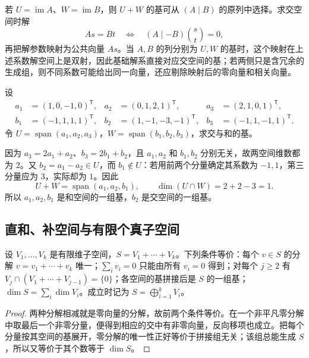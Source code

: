 若 $U=\operatorname{im}A$、$W=\operatorname{im}B$，则 $U+W$ 的基可从 $(A\mid B)$ 的原列中选择。求交空间时解
\begin{equation}
\label{eq:laex-intersection-system}
As=Bt\quad\Longleftrightarrow\quad (A\mid-B)\binom st=0,
\end{equation}
再把解参数映射为公共向量 $As$。当 $A,B$ 的列分别为 $U,W$ 的基时，这个映射在上述系数解空间上是双射，因此基础解系直接对应交空间的基；若两侧只是含冗余的生成组，则不同系数可能给出同一向量，还应剔除映射后的零向量和相关向量。

\begin{example}
\label{ex:laex-intersection}
设
\[
\begin{aligned}
a_1&=(1,0,-1,0)^{\mathsf T},&a_2&=(0,1,2,1)^{\mathsf T},&a_3&=(2,1,0,1)^{\mathsf T},\\
b_1&=(-1,1,1,1)^{\mathsf T},&b_2&=(1,-1,-3,-1)^{\mathsf T},&b_3&=(-1,1,-1,1)^{\mathsf T}.
\end{aligned}
\]
令 $U=\operatorname{span}(a_1,a_2,a_3)$，$W=\operatorname{span}(b_1,b_2,b_3)$，求交与和的基。
\end{example}

\begin{solve}
因为 $a_3=2a_1+a_2$、$b_3=2b_1+b_2$，且 $a_1,a_2$ 和 $b_1,b_2$ 分别无关，故两空间维数都为 $2$。又 $b_2=a_1-a_2\in U$，而 $b_1\notin U$：若用前两个分量确定其系数为 $-1,1$，第三分量应为 $3$，实际却为 $1$。因此
\[
U+W=\operatorname{span}(a_1,a_2,b_1),\qquad
\dim(U\cap W)=2+2-3=1.
\]
所以 $a_1,a_2,b_1$ 是和空间的一组基，$b_2$ 是交空间的一组基。
\end{solve}

\subsection{直和、补空间与有限个真子空间}

\begin{proposition}
\label{prop:laex-direct-sum}
设 $V_1,\ldots,V_k$ 是有限维子空间，$S=V_1+\cdots+V_k$。下列条件等价：每个 $v\in S$ 的分解 $v=v_1+\cdots+v_k$ 唯一；$\sum_i v_i=0$ 只能由所有 $v_i=0$ 得到；对每个 $j\ge2$ 有 $V_j\cap(V_1+\cdots+V_{j-1})=\{0\}$；各空间的基拼接后是 $S$ 的一组基；$\dim S=\sum_i\dim V_i$。成立时记为 $S=\bigoplus_{i=1}^k V_i$。
\end{proposition}

\begin{proof}
两种分解相减就是零向量的分解，故前两个条件等价。在一个非平凡零分解中取最后一个非零分量，便得到相应的交中有非零向量，反向移项也成立。把每个分量按其空间的基展开，零分解的唯一性正好等价于拼接组无关；该组总能生成 $S$，所以又等价于其个数等于 $\dim S$。
\end{proof}


